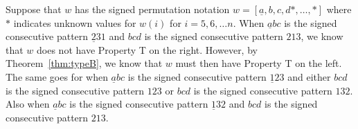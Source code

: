 \begin{remark}
Suppose that $w$ has the signed permutation notation $w=[\underline{a},b,c,d \ast, \ldots, \ast]$ where $\ast$ indicates unknown values for $w(i)$ for $i=5,6, \ldots n$. When $\underline{a}bc$ is the signed consecutive pattern $\underline{2}31$ and $bcd$ is the signed consecutive pattern $213$, we know that $w$ does not have Property T on the right. However, by Theorem~\ref{thm:typeB}, we know that $w$ must then have Property T on the left. The same goes for when $\underline{a}bc$ is the signed consecutive pattern $\underline{1}23$ and either $bcd$ is the signed consecutive pattern $123$ or $bcd$ is the signed consecutive pattern $132$. Also when $\underline{a}bc$ is the signed consecutive pattern $\underline{1}32$ and $bcd$ is the signed consecutive pattern $213$.	
\end{remark}






